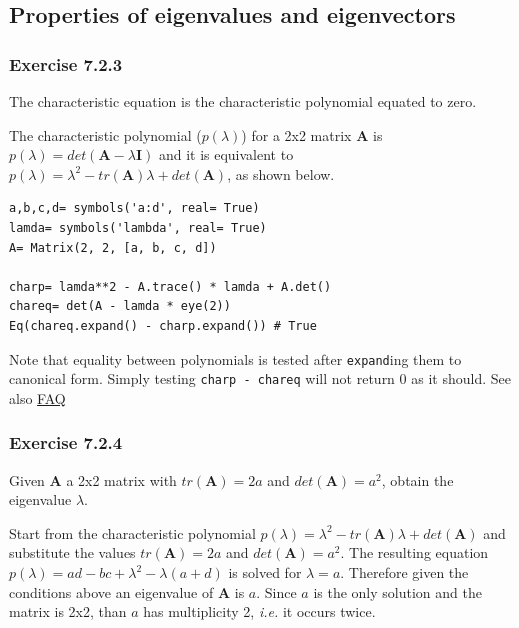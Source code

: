 \subsection{Properties of eigenvalues and eigenvectors}

\subsubsection{Exercise 7.2.3}

The characteristic equation is the characteristic polynomial equated to zero.

The characteristic polynomial ($p(\lambda)$) for a 2x2 matrix \textbf{A} is
$p(\lambda) = det(\mathbf{A} - \lambda \mathbf{I})$ and it is equivalent
to $p(\lambda) = \lambda^2 - tr(\mathbf{A}) \lambda + det(\mathbf{A})$, as shown below.

\begin{verbatim}
a,b,c,d= symbols('a:d', real= True)
lamda= symbols('lambda', real= True)
A= Matrix(2, 2, [a, b, c, d])

charp= lamda**2 - A.trace() * lamda + A.det()
chareq= det(A - lamda * eye(2))
Eq(chareq.expand() - charp.expand()) # True
\end{verbatim}

Note that equality between polynomials is tested after \texttt{expand}ing them to canonical
form. Simply testing \texttt{charp - chareq} will not return 0 as it should. See also
\sympy \href{https://github.com/sympy/sympy/wiki/Faq}{FAQ}

\subsubsection{Exercise 7.2.4}

Given \textbf{A} a 2x2 matrix with $tr(\mathbf{A}) = 2a$ and $det(\mathbf{A}) = a^2$,
obtain the eigenvalue $\lambda$. 

Start from the characteristic polynomial $p(\lambda) = \lambda^2 - tr(\mathbf{A})\lambda + det(\mathbf{A})$
and substitute the values $tr(\mathbf{A}) = 2a$ and $det(\mathbf{A}) = a^2$. The resulting
equation $p(\lambda) = a d - b c + \lambda^{2} - \lambda \left(a + d\right)$ is solved
for $\lambda= a$. Therefore given the conditions above an eigenvalue of \textbf{A} is
$a$. Since $a$ is the only solution and the matrix is 2x2, than $a$ has multiplicity 2,
\textit{i.e.} it occurs twice.

